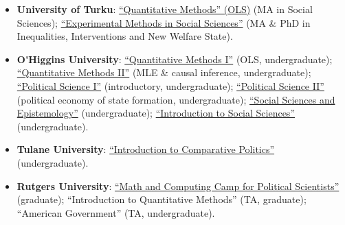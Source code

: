 \begin{itemize}

  \item[\textcolor{gray}{\textbullet}]  {\bf University of Turku}: 
  \href{https://github.com/hbahamonde/OLS/raw/master/Bahamonde_OLS.pdf}{``Quantitative Methods'' (OLS)} {\color{gray}(MA in Social Sciences)}; 
  \href{https://github.com/hbahamonde/Exp_Soc_Science/raw/main/Bahamonde_Exp_Soc_Sci.pdf}{``Experimental Methods in Social Sciences''} {\color{gray}(MA \& PhD in Inequalities, Interventions and New Welfare State)}.

  \item[\textcolor{gray}{\textbullet}]  {\bf O\'\unskip Higgins University}: 
  \href{https://github.com/hbahamonde/OLS/raw/master/Lectures/Spanish/Bahamonde_OLS_Spanish.pdf}{``Quantitative Methods I''} {\color{gray}(OLS, undergraduate)}; 
  \href{https://github.com/hbahamonde/MLE/raw/master/Lectures/Spanish/Bahamonde_MLE_Spanish.pdf}{``Quantitative Methods II''} {\color{gray}(MLE \& causal inference, undergraduate)}; 
  \href{https://github.com/hbahamonde/Ciencia_Politica_I/raw/master/Bahamonde_Ciencia_Politica_I.pdf}{``Political Science I''} {\color{gray}(introductory, undergraduate)}; 
  \href{https://github.com/hbahamonde/Ciencia_Politica_II/raw/master/Bahamonde_Ciencia_Politica_II.pdf}{``Political Science II''} {\color{gray}(political economy of state formation, undergraduate)}; 
  \href{https://github.com/hbahamonde/Social_Sciences_Epistemology_UGRAD/raw/master/Bahamonde_Social_Sciences_Epistemology_UGRAD_Syllabus.pdf}{``Social Sciences and Epistemology''} {\color{gray}(undergraduate)}; 
  \href{https://github.com/hbahamonde/Intro_Ciencias_Sociales/raw/master/Bahamonde_Intro_Ciencias_Sociales.pdf}{``Introduction to Social Sciences''} {\color{gray}(undergraduate)}.

  \item[\textcolor{gray}{\textbullet}]  {\bf Tulane University}: 
  \href{https://github.com/hbahamonde/Comparative_Politics_UGRAD/raw/master/Bahamonde_Comparative_Politics_Syllabus_UGRAD.pdf}{``Introduction to Comparative Politics''} {\color{gray}(undergraduate)}.

  \item[\textcolor{gray}{\textbullet}]  {\bf Rutgers University}: 
  \href{http://github.com/hbahamonde/Math-Camp/raw/master/Syllabus/Math_Camp_Syllabus.pdf}{``Math and Computing Camp for Political Scientists''} {\color{gray}(graduate)}; 
  ``Introduction to Quantitative Methods'' {\color{gray}(TA, graduate)}; 
  ``American Government'' {\color{gray}(TA, undergraduate)}.

\end{itemize}